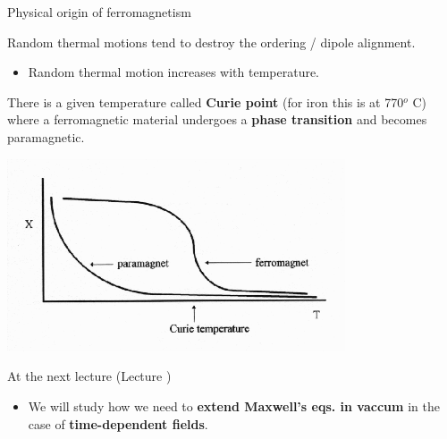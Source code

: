 \begin{frame}{Physical origin of ferromagnetism}

Random thermal motions tend to destroy the ordering / dipole alignment.
\begin{itemize}
   \item Random thermal motion increases with temperature.
\end{itemize}

\vspace{0.2cm}

There is a given temperature called {\bf Curie point} (for iron this is at 770$^{o}$ C)
where a ferromagnetic material undergoes a {\bf phase transition} and
becomes paramagnetic.\\

\begin{center}
   \includegraphics[width=0.75\textwidth]{./images/schematics/curie_temperature_01.png}\\
\end{center}

\end{frame}




%
%

\renewcommand{\lecturesummarytitle}{Main points to remember }


%
%

\begin{frame}{At the next lecture (Lecture \nextlecture)}

\begin{itemize}
  \item We will study how we need to {\bf extend Maxwell's eqs. in vaccum}
        in the case of {\bf time-dependent fields}.
\end{itemize}

\end{frame}

%
%



